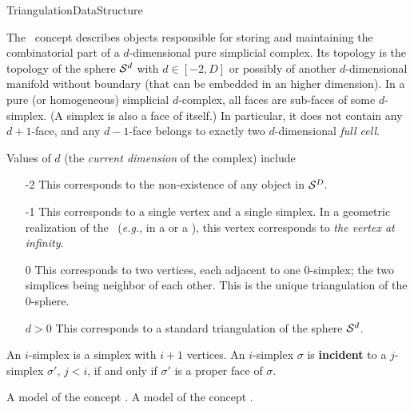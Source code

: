 \begin{ccRefConcept}{TriangulationDataStructure}

\ccDefinition

The \ccRefName\ concept describes objects responsible for storing and
maintaining the combinatorial part of a
$d$-dimensional pure simplicial complex. Its topology is the topology
of the sphere  $\mathcal S^d$ with $d\in[-2,D]$
or possibly of another $d$-dimensional manifold without boundary 
(that can be embedded in an higher dimension).
 In a  pure (or homogeneous) simplicial $d$-complex, all
 faces are sub-faces of some $d$-simplex. (A
simplex is also a face of itself.) In particular, it does not
contain any $d+1$-face, and any $d-1$-face belongs to exactly
two $d$-dimensional {\em full cell}. 

Values of $d$ (the \emph{current dimension} of the complex) include \begin{itemize}

\item[-2] This corresponds to the non-existence of any object in
$\mathcal S^D.$

\item[-1] This corresponds to a single vertex and a single simplex. In a
geometric realization of the \ccRefName\ (\emph{e.g.}, in a
 or a
), this vertex
corresponds to \emph{the vertex at infinity}.

\item[0] This corresponds to two vertices, each adjacent to one $0$-simplex;
the two simplices being neighbor of each other. This is the unique
triangulation of the $0$-sphere.

\item[$d>0$] This corresponds to a standard triangulation of the sphere
$\mathcal S^d$.
\end{itemize}

An $i$-simplex is a simplex with $i+1$ vertices. An $i$-simplex $\sigma$ is
\textbf{incident} to a $j$-simplex $\sigma'$, $j<i$, if and only if $\sigma'$
is a proper face of $\sigma$. 

\ccHasModels


\ccTypes

{
A model of the concept .
}
\ccGlue
{}
{
A model of the concept .
}


\end{ccRefConcept}
